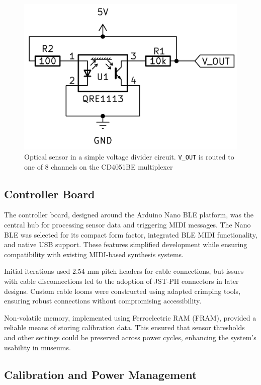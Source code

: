 \begin{figure}  
  \centering
  \includegraphics[width=\linewidth]{src/images/simple-schematic-bw-.jpg} 
  \caption{Optical sensor in a simple voltage divider circuit. \texttt{V\_OUT} is routed to one of 8 channels on the CD4051BE multiplexer}
  \Description{} 
  \label{fig:simple-schematic}
\end{figure}

\subsection{Controller Board}\label{controller-board}

The controller board, designed around the Arduino Nano BLE platform, was the central hub for processing sensor data and triggering MIDI messages. The Nano BLE was selected for its compact form factor, integrated BLE MIDI functionality, and native USB support. These features simplified development while ensuring compatibility with existing MIDI-based synthesis systems.

Initial iterations used 2.54 mm pitch headers for cable connections, but issues with cable disconnections led to the adoption of JST-PH connectors in later designs. Custom cable looms were constructed using adapted crimping tools, ensuring robust connections without compromising accessibility.

Non-volatile memory, implemented using Ferroelectric RAM (FRAM), provided a reliable means of storing calibration data. This ensured that sensor thresholds and other settings could be preserved across power cycles, enhancing the system's usability in museums.

\subsection{Calibration and Power Management}\label{calibration}


